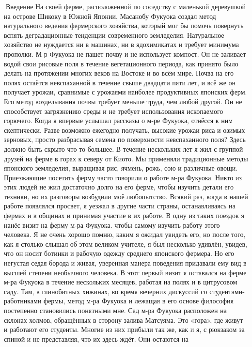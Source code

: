 \documentclass[a4paper]{book}
\begin{document}
Введение
На своей ферме, расположенной по соседству с маленькой деревушкой на острове
Шикоку в Южной Японии, Масанобу Фукуока создал метод натурального ведения
фермерского хозяйства, который мог бы помочь повернуть вспять деградационные
тенденции современного земледелия. Натуральное хозяйство не нуждается ни в машинах, ни
в ядохимикатах и требует минимума прополки. М‑р Фукуока не пашет почву и не использует
компост. Он не заливает водой свои рисовые поля в течение вегетационного периода, как
принято было делать на протяжении многих веков на Востоке и во всём мире. Почва на его
полях остаётся невспаханной в течение свыше двадцати пяти лет, и всё же он получает
урожаи, сравнимые с урожаями наиболее продуктивных японских ферм. Его метод
возделывания почвы требует меньше труда, чем любой другой. Он не способствует
загрязнению среды и не требует использования ископаемого горючего.
Когда я впервые услышал рассказы о м-ре Фукуока, отнёсся к ним скептически. Разве
возможно ежегодно получать, высокие урожаи риса и озимых зерновых, просто разбрасывая
семена по поверхности невспаханного поля? Здесь должно быть скрыто что-то большее.
В течение нескольких лет я жил с группой друзей на ферме в горах к северу от Киото.
Мы применяли традиционные методы японского земледелия, выращивая рис, ячмень, рожь,
сою и различные овощи. Приезжающие посетить ферму часто говорили о работе м-ра
Фукуока. Никто из этих людей не жил достаточно долго на его ферме, чтобы изучить детали
его техники, но их разговоры возбудили моё любопытство. Всякий раз, когда в нашей работе
появлялся просвет, я уезжал в другие части страны, останавливаясь на фермах и в общинах и
принимая участие в их работе. В одну из таких поездок я нанёс визит на ферму м-ра
Фукуока. чтобы самому изучить работу этого человека.
Я не очень хорошо помню, каким я ожидал увидеть его, но после того, как я столько
слышал об этом великом учителе, я был несколько удивлён, увидев, что он носит ботинки и
рабочую одежду среднего японского фермера. Но его негустая седая борода и живая,
уверенная манера поведения придавали ему вид в высшей степени необычного человека.
В этот первый визит я оставался на ферме м-ра Фукуока в течение нескольких месяцев,
работая на полях и в цитрусовом саду. Там, в глинобитных хижинах, во время вечерних
дискуссий со студентами-работниками фермы, метод м-ра Фукуока и лежащая в его основе
философия постепенно становились понятными мне.
Сад м-ра Фукуока расположен на склонах холмов, обращённых в сторону залива
Матсуяма. Это «гора», где живут и работают его студенты. Многие из них прибыли так же,
как и я, с рюкзаком за спиной и не представляя, что их здесь ждёт. Они остаются на
\end{document}
